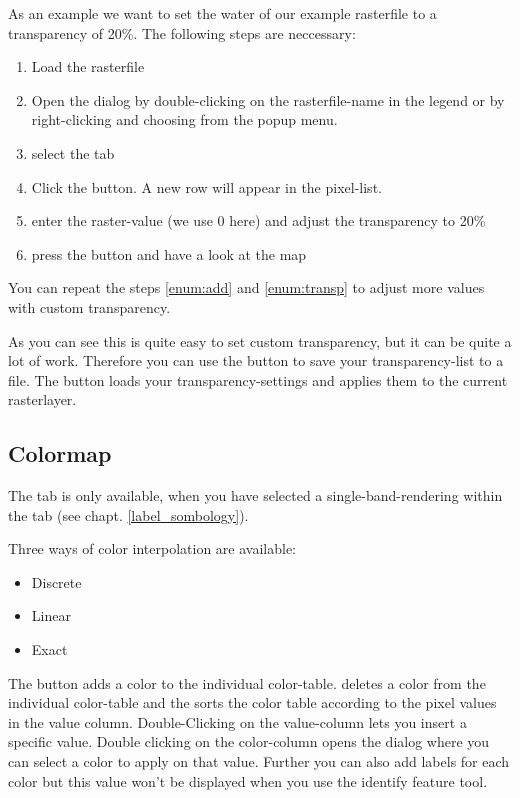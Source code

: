 As an example we want to set the water of our example rasterfile
 to a transparency of 20\%. The following steps
are neccessary:
\begin{enumerate}
 \item  Load the rasterfile 
 \item Open the  dialog by double-clicking on the
 rasterfile-name in the legend or by right-clicking and choosing
  from the popup menu.
 \item select the  tab
 \item \label{enum:add} Click the 
 button. A new row will appear in the pixel-list.
 \item \label{enum:transp} enter the raster-value (we use 0 here) and adjust the
 transparency to 20\%
 \item press the  button and have a look at the map
\end{enumerate}

You can repeat the steps \ref{enum:add} and \ref{enum:transp} to adjust
more values with custom transparency.

As you can see this is quite easy to set custom transparency, but it can be
quite a lot of work. Therefore you can use the button
 to save your
transparency-list to a file. The button
 loads your
transparency-settings and applies them to the current rasterlayer.

\subsection{Colormap} \label{label_colormaptab}

The  tab is only available, when you have selected a
single-band-rendering within the  tab (see chapt. \ref{label_sombology}).

Three ways of color interpolation are available:
\begin{itemize}[label=--]
\item Discrete
\item Linear
\item Exact
\end{itemize}

The button  adds a color to the individual color-table. 
 deletes a color from the individual color-table and the 
 sorts the color table according to the pixel values in the 
value column. Double-Clicking on the value-column lets you insert a 
specific value. Double clicking on the color-column opens the dialog 
 where you can select a color to apply on that value. Further you can also add labels for each color but this value won't be displayed when you use the identify feature tool.   

